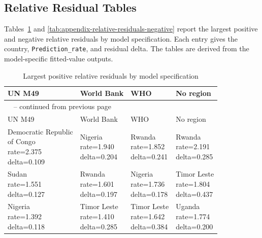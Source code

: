 \documentclass[runningheads]{llncs}
\begin{document}
\subsection{Relative Residual Tables}

Tables~\ref{tab:appendix-relative-residuals-positive} and \ref{tab:appendix-relative-residuals-negative} report the largest positive and negative relative residuals by model specification. Each entry gives the country, \texttt{Prediction\_rate}, and residual delta. The tables are derived from the model-specific fitted-value outputs.

{\scriptsize
\renewcommand{\arraystretch}{1.12}
\setlength{\tabcolsep}{3pt}
\begin{longtable}{p{}p{}p{}p{}}
\caption{Largest positive relative residuals by model specification}\label{tab:appendix-relative-residuals-positive}\\
\hline
UN M49 & World Bank & WHO & No region \\
\hline
\endfirsthead
\multicolumn{4}{l}{\tablename\ \thetable{} -- continued from previous page}\\
\hline
UN M49 & World Bank & WHO & No region \\
\hline
\endhead
\shortstack[l]{Democratic Republic\\ of Congo\\ rate=2.375\\ delta=0.109} &\shortstack[l]{Nigeria\\ rate=1.940\\ delta=0.204} &\shortstack[l]{Rwanda\\ rate=1.852\\ delta=0.241} &\shortstack[l]{Rwanda\\ rate=2.191\\ delta=0.285} \\
\hline
\shortstack[l]{Sudan\\ rate=1.551\\ delta=0.127} &\shortstack[l]{Rwanda\\ rate=1.601\\ delta=0.197} &\shortstack[l]{Nigeria\\ rate=1.736\\ delta=0.178} &\shortstack[l]{Timor Leste\\ rate=1.804\\ delta=0.437} \\
\hline
\shortstack[l]{Nigeria\\ rate=1.392\\ delta=0.118} &\shortstack[l]{Timor Leste\\ rate=1.410\\ delta=0.285} &\shortstack[l]{Timor Leste\\ rate=1.642\\ delta=0.384} &\shortstack[l]{Uganda\\ rate=1.774\\ delta=0.200} \\

\end{longtable}}
\end{document}
